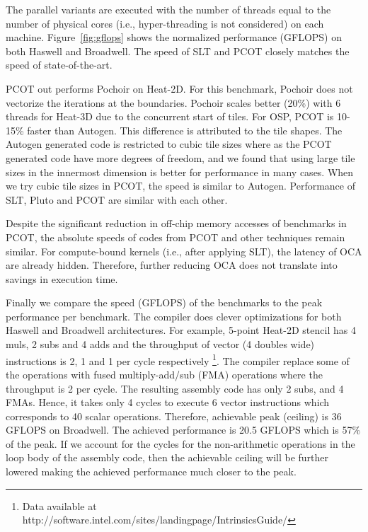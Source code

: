 The parallel variants are executed with the number of threads equal to the
number of physical cores (i.e., hyper-threading is not considered) on each
machine.  Figure~\ref{fig:gflops} shows the normalized performance (GFLOPS) on
both Haswell and Broadwell. The speed of SLT and PCOT closely matches the
speed of state-of-the-art.

PCOT out performs Pochoir on Heat-2D. For this benchmark, Pochoir does not
vectorize the iterations at the boundaries. Pochoir scales better (20\%) with
6 threads for Heat-3D due to the concurrent start of tiles. 
%
For OSP, PCOT is 10-15\% faster than Autogen. This difference is attributed to
the tile shapes. The Autogen generated code is restricted to cubic tile sizes
where as the PCOT generated code have more degrees of freedom, and we found
that using large tile sizes in the innermost dimension is better for
performance in many cases. When we try cubic tile sizes in PCOT, the speed is
similar to Autogen.
%
Performance of SLT, Pluto and PCOT are similar with each other.

Despite the significant reduction in off-chip memory accesses of benchmarks in
PCOT, the absolute speeds of codes from PCOT and other techniques remain
similar. For compute-bound kernels (i.e., after applying SLT), the latency of
OCA are already hidden. Therefore, further reducing OCA does not translate
into savings in execution time. 

Finally we compare the speed (GFLOPS) of the benchmarks to the peak
performance per benchmark. The compiler does clever optimizations for both
Haswell and Broadwell architectures. For example, 5-point Heat-2D stencil has
4 muls, 2 subs and 4 adds and the throughput of vector (4 doubles wide)
instructions is 2, 1 and 1 per cycle respectively \footnote{Data available at
http://software.intel.com/sites/landingpage/IntrinsicsGuide/}. 
The compiler replace some of the operations with fused multiply-add/sub (FMA)
operations where the throughput is 2 per cycle. The resulting assembly code
has only 2 subs, and 4 FMAs.  Hence, it takes only 4 cycles to execute 6
vector instructions which corresponds to 40 scalar operations. Therefore,
achievable peak (ceiling) is 36 GFLOPS on Broadwell. The achieved performance
is 20.5 GFLOPS which is 57\% of the peak. If we account for the cycles for the
non-arithmetic operations in the loop body of the assembly code, then the
achievable ceiling will be further lowered making the achieved performance
much closer to the peak.

